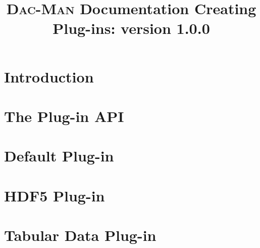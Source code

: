 \documentclass[oneside,11pt]{memoir}
\newcommand{\systemname}{\textsc{Dac}-\textsc{Man}\xspace}
\begin{document}
\title{\Huge \systemname Documentation \newline\newline \Large Creating Plug-ins: version 1.0.0}

\maketitle

\newpage

\tableofcontents*

\chapter{Introduction}
\label{ch:intro}


\chapter{The Plug-in API}
\label{ch:api}


\chapter{Default Plug-in}
\label{ch:default}


\chapter{HDF5 Plug-in}
\label{ch:hdf5}


\chapter{Tabular Data Plug-in}
\label{ch:tabular}

                                   
\end{document}

